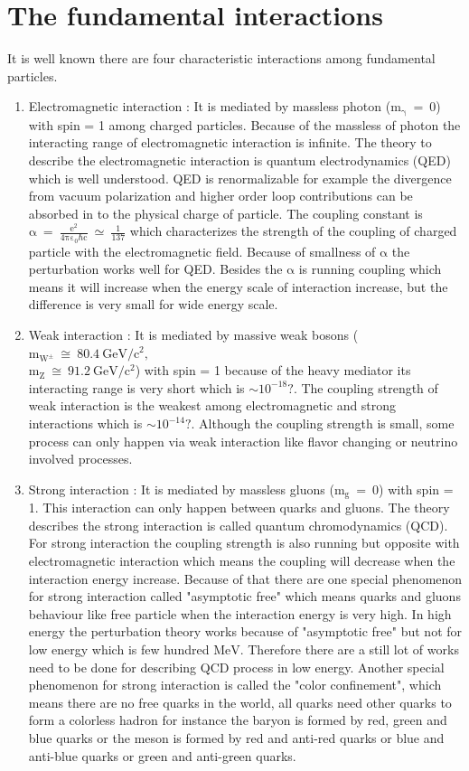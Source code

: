 \section{The fundamental interactions}\label{subsec:fund_interaction}
It is well known there are four characteristic interactions among fundamental particles.
\begin{enumerate}
\item Electromagnetic interaction : It is mediated by massless photon ($\mathrm{m_{\gamma}~=~0}$) with spin = 1 among charged particles. Because of the massless of photon the interacting range of electromagnetic interaction is infinite. The theory to describe the electromagnetic interaction is quantum electrodynamics (QED) which is well understood.  QED is renormalizable for example the divergence from vacuum polarization and higher order loop contributions can be absorbed in to the physical charge of particle. The coupling constant is $\mathrm{\alpha~=~\frac{e^{2}}{4\pi\varepsilon_{0}\hbar c}} ~\simeq ~ \frac{1}{137}$ which characterizes the strength of the coupling of charged particle with the electromagnetic field. Because of smallness of $\mathrm{\alpha}$ the perturbation works well for QED. Besides the $\mathrm{\alpha}$ is running coupling which means it will increase when the energy scale of interaction increase, but the difference is very small for wide energy scale.
\item Weak interaction : It is mediated by massive weak bosons ($\mathrm{m_{W^{\pm}}~\cong~80.4~GeV/c^{2},}$ \\ $\mathrm{m_{Z}~\cong~91.2~GeV/c^{2}}$) with spin = 1 because of the heavy mediator its interacting range is very short which is $\sim 10^{-18}?$. The coupling strength of weak interaction is the weakest among electromagnetic and strong interactions which is $\sim 10^{-14}?$. Although the coupling strength is small, some process can only happen via weak interaction like flavor changing or neutrino involved
    processes.
\item Strong interaction : It is mediated by massless gluons ($\mathrm{m_{g}~=~0}$) with spin = 1. This interaction can only happen between quarks and gluons. The theory describes the strong interaction is called quantum chromodynamics (QCD). For strong interaction the coupling strength is also running but opposite with electromagnetic interaction which means the coupling will decrease when the interaction energy increase. Because of that there are one special phenomenon for strong interaction called "asymptotic free" which means quarks and gluons behaviour like free particle when the interaction energy is very high. In high energy the perturbation theory works because of "asymptotic free" but not for low energy which is few hundred $\mathrm{MeV}$. Therefore there are a still lot of works need to be done for describing QCD process in low energy. Another special phenomenon for strong interaction is called the "color confinement", which means there are no free quarks in the world, all quarks need other quarks to form a colorless hadron for instance the baryon is formed by red, green and blue quarks or the meson is formed by red and anti-red quarks or blue and anti-blue quarks or green and anti-green quarks.

\end{enumerate}
